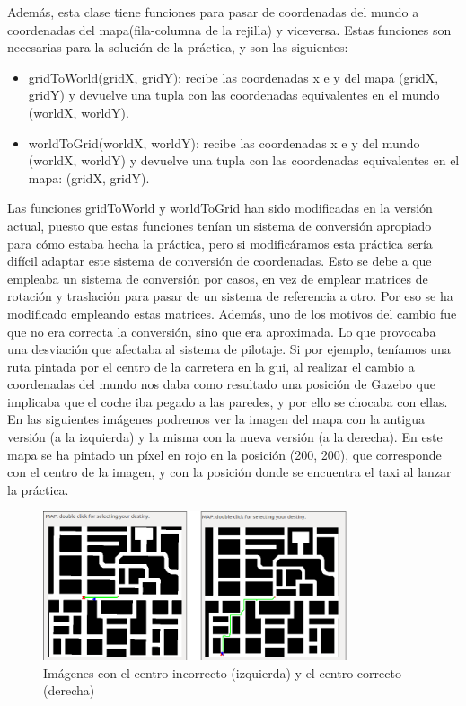 Además, esta clase tiene funciones para pasar de coordenadas del mundo a coordenadas del mapa(fila-columna de la rejilla) y viceversa. Estas funciones son necesarias para la solución de la práctica, y son las siguientes:

\begin{itemize}
\item gridToWorld(gridX, gridY): recibe las coordenadas x e y del mapa (gridX, gridY) y devuelve una tupla con las coordenadas equivalentes en el mundo (worldX, worldY).
\item worldToGrid(worldX, worldY): recibe las coordenadas x e y del mundo (worldX, worldY) y devuelve una tupla con las coordenadas equivalentes en el mapa: (gridX, gridY).

\end{itemize}

Las funciones gridToWorld y worldToGrid han sido modificadas en la versión actual, puesto que estas funciones tenían un sistema de conversión apropiado para cómo estaba hecha la práctica, pero si modificáramos esta práctica sería difícil adaptar este sistema de conversión de coordenadas. Esto se debe a que empleaba un sistema de conversión por casos, en vez de emplear matrices de rotación y traslación para pasar de un sistema de referencia a otro. Por eso se ha modificado empleando estas matrices. Además, uno de los motivos del cambio fue que no era correcta la conversión, sino que era aproximada. Lo que provocaba una desviación que afectaba al sistema de pilotaje. Si por ejemplo, teníamos una ruta pintada por el centro de la carretera en la \acrshort{gui}, al realizar el cambio a coordenadas del mundo nos daba como resultado una posición de Gazebo que implicaba que el coche iba pegado a las paredes, y por ello se chocaba con ellas. En las siguientes imágenes podremos ver la imagen del mapa con la antigua versión (a la izquierda) y la misma con la nueva versión (a la derecha). En este mapa se ha pintado un píxel en rojo en la posición (200, 200), que corresponde con el centro de la imagen, y con la posición donde se encuentra el taxi al lanzar la práctica. 

\begin{figure}[H]
  \begin{center}
    \includegraphics[width=0.8\textwidth]{figures/GPP/centros.png}
		\caption{Imágenes con el centro incorrecto (izquierda) y el centro correcto (derecha)}
		\label{fig.centros}
		\end{center}
\end{figure}

